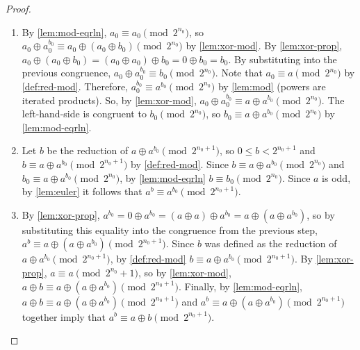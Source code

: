 \documentclass[1gpt]{article}
\theoremstyle{break}
\newcommand{\xor}{\oplus}
\begin{document}
\begin{proof}
\begin{enumerate}
            \begin{enumerate}

                \item

                    By \ref{lem:mod-eqrln}, $a_0 \equiv a_0 \pmod{2^{n_0}}$, so
                    $a_0 \xor a_0^{b_0} \equiv a_0 \xor (a_0 \xor b_0)
                    \pmod{2^{n_0}}$ by \ref{lem:xor-mod}. By
                    \ref{lem:xor-prop}, $a_0 \xor (a_0 \xor b_0) = (a_0 \xor
                    a_0) \xor b_0 = 0 \xor b_0 = b_0$. By substituting into the
                    previous congruence, $a_0 \xor a_0^{b_0} \equiv b_0
                    \pmod{2^{n_0}}$. Note that $a_0 \equiv a \pmod{2^{n_0}}$ by
                    \ref{def:red-mod}. Therefore, $a_0^{b_0} \equiv a^{b_0}
                    \pmod{2^{n_0}}$ by \ref{lem:mod} (powers are iterated
                    products). So, by \ref{lem:xor-mod}, $a_0 \xor a_0^{b_0}
                    \equiv a \xor a^{b_0} \pmod{2^{n_0}}$. The left-hand-side
                    is congruent to $b_0 \pmod{2^{n_0}}$, so $b_0 \equiv a \xor
                    a^{b_0} \pmod{2^{n_0}}$ by \ref{lem:mod-eqrln}.

                \item

                    Let $b$ be the reduction of $a \xor a^{b_0}
                    \pmod{2^{n_0+1}}$, so $0 \leq b < 2^{n_0+1}$ and $b \equiv
                    a \xor a^{b_0} \pmod{2^{n_0+1}}$ by \ref{def:red-mod}.
                    Since $b \equiv a \xor a^{b_0} \pmod{2^{n_0}}$ and $b_0
                    \equiv a \xor a^{b_0} \pmod{2^{n_0}}$, by
                    \ref{lem:mod-eqrln} $b \equiv b_0 \pmod{2^{n_0}}$. Since
                    $a$ is odd, by \ref{lem:euler} it follows that $a^b \equiv
                    a^{b_0} \pmod{2^{n_0+1}}$.

                \item

                    By \ref{lem:xor-prop}, $a^{b_0} = 0 \xor a^{b_0} = (a \xor
                    a) \xor a^{b_0} = a \xor (a \xor a^{b_0})$, so by
                    substituting this equality into the congruence from the
                    previous step, $a^b \equiv a \xor (a \xor a^{b_0})
                    \pmod{2^{n_0+1}}$. Since $b$ was defined as the reduction
                    of $a \xor a^{b_0} \pmod{2^{n_0+1}}$, by \ref{def:red-mod}
                    $b \equiv a \xor a^{b_0} \pmod{2^{n_0+1}}$. By
                    \ref{lem:xor-prop}, $a \equiv a \pmod{2^{n_0}+1}$, so by
                    \ref{lem:xor-mod}, $a \xor b \equiv a \xor (a \xor a^{b_0})
                    \pmod{2^{n_0+1}}$. Finally, by \ref{lem:mod-eqrln}, $a \xor
                    b \equiv a \xor (a \xor a^{b_0}) \pmod{2^{n_0+1}}$ and $a^b
                    \equiv a \xor (a \xor a^{b_0}) \pmod{2^{n_0+1}}$ together
                    imply that $a^b \equiv a \xor b \pmod{2^{n_0+1}}$.


\end{enumerate}
\end{enumerate}
\end{proof}
\end{document}
